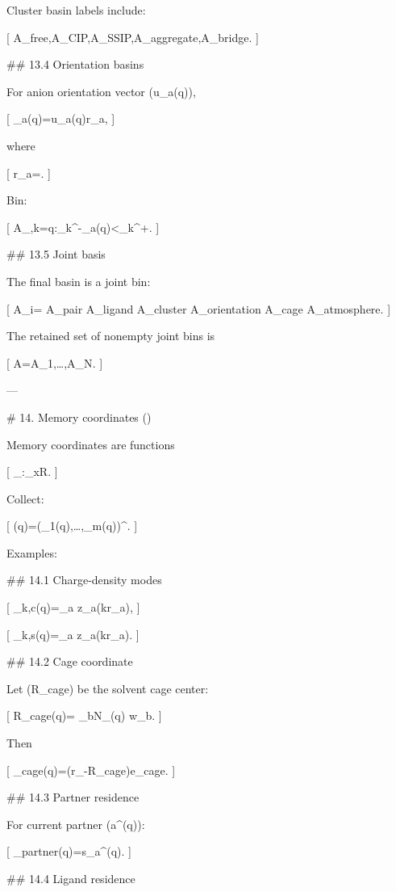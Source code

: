 Cluster basin labels include:

[
A_{\rm free},\quad A_{\rm CIP},\quad A_{\rm SSIP},\quad A_{\rm aggregate},\quad A_{\rm bridge}.
]

## 13.4 Orientation basins

For anion orientation vector (u_a(q)),

[
\omega_a(q)=u_a(q)\cdot \hat r_{\ell a},
]

where

[
\hat r_{\ell a}=.
]

Bin:

[
A_{\omega,k}={q:\omega_k^-\le\omega_a(q)<\omega_k^+}.
]

## 13.5 Joint basis

The final basin is a joint bin:

[
A_i=
A_{\rm pair}
\cap
A_{\rm ligand}
\cap
A_{\rm cluster}
\cap
A_{\rm orientation}
\cap
A_{\rm cage}
\cap
A_{\rm atmosphere}.
]

The retained set of nonempty joint bins is

[
\mathcal A={A_1,\ldots,A_N}.
]

---

# 14. Memory coordinates (\Psi)

Memory coordinates are functions

[
\psi_\alpha:\Omega_x\to\mathbb R.
]

Collect:

[
\Psi(q)=(\psi_1(q),\ldots,\psi_m(q))^\top.
]

Examples:

## 14.1 Charge-density modes

[
\psi_{k,c}(q)=\sum_a z_a\cos(k\cdot r_a),
]

[
\psi_{k,s}(q)=\sum_a z_a\sin(k\cdot r_a).
]

## 14.2 Cage coordinate

Let (R_{\rm cage}) be the solvent cage center:

[
R_{\rm cage}(q)=
{\sum_{b\in\mathcal N_\ell(q)} w_b}.
]

Then

[
\psi_{\rm cage}(q)=(r_\ell-R_{\rm cage})\cdot e_{\rm cage}.
]

## 14.3 Partner residence

For current partner (a^\star(q)):

[
\psi_{\rm partner}(q)=s_{\ell a^\star}(q).
]

## 14.4 Ligand residence

